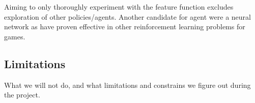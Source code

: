 Aiming to only thoroughly experiment with the feature function excludes 
exploration of other policies/agents. Another candidate for agent were a neural
network as have proven effective in other reinforcement learning 
problems for games.


\subsection{Limitations}

What we will not do, and what limitations and constrains
we figure out during the project.

